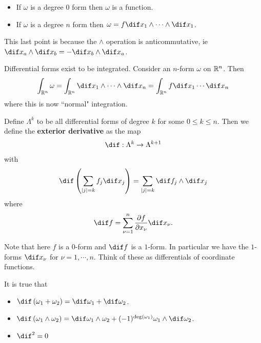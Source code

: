 \begin{remark} \hphantom{.}
    \begin{itemize}
        \item If $\omega$ is a degree $0$ form  then $\omega$ is a function.
        \item If $\omega $ is a degree $n$ form then $\omega = f \dif x_1 \wedge \cdots \wedge \dif x_1$.
    \end{itemize}
    This last point is because the $\wedge$ operation is anticommutative, ie $\dif x_a \wedge \dif x_b = - \dif x_b \wedge \dif x_a$.
\end{remark}
\begin{remark}
    Differential forms exist to be integrated. Consider an $n$-form $\omega $ on $\mathbb{R}^n$. Then
    \begin{align*}
        \int_{\R^n} \omega = \int_{\R^n} \dif x_1 \wedge \cdots \wedge \dif x_n = \int_{\R^n} f \dif x_1 \cdots \dif x_n
    \end{align*}
    where this is now ``normal" integration.
\end{remark}
\begin{definition}
    Define $\Lambda^k$ to be all differential forms of degree $k$ for some $ 0 \leq k \leq n$. Then we define the \textbf{exterior derivative} as the map
    \begin{align*}
        \dif : \Lambda^k \to \Lambda^{k+1}
    \end{align*}
    with
    \begin{align*}
        \dif \left( \sum_{|j| = k} f_j \dif x_j \right) = \sum_{|j| = k} \dif f_j \wedge \dif x_j 
    \end{align*}
    where
    \begin{align*}
        \dif f = \sum_{\nu = 1}^n \frac{\partial f}{\partial x_{\nu}} \dif x_\nu.
    \end{align*}
\end{definition}
Note that here $f$ is a $0$-form and $\dif f$ is a $1$-form. In particular we have the $1$-forms $\dif x_\nu$ for $\nu = 1 , \cdots, n$. Think of these as differentials of coordinate functions.

\begin{remark}
    It is true that
    \begin{itemize}
        \item $\dif \left( \omega_1 + \omega_2 \right) = \dif \omega_1 + \dif \omega_2$.
        \item $\dif \br{\omega_1 \wedge \omega_2} = \dif \omega_1 \wedge \omega_2 + (-1)^{\deg (\omega_1) } \omega_1 \wedge \dif \omega_2$.
        \item $\dif^2 = 0$
    \end{itemize}
\end{remark}

